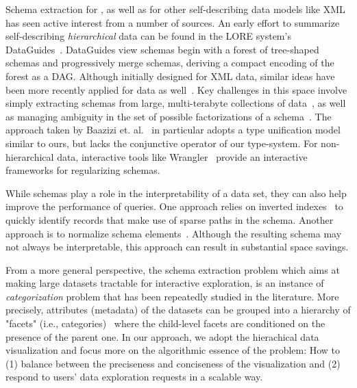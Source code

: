 Schema extraction for \json, as well as for other self-describing data models like XML has seen active interest from a number of sources. 
An early effort to summarize self-describing \emph{hierarchical} data can be found in the LORE system's DataGuides~\cite{DBLP:conf/vldb/GoldmanW97}.
DataGuides view schemas begin with a forest of tree-shaped schemas and progressively merge schemas, deriving a compact encoding of the forest as a DAG.
Although initially designed for XML data, similar ideas have been more recently applied for \json data as well~\cite{DBLP:conf/cidr/LiuG15,DBLP:conf/sigmod/LiuHMLC16}.
Key challenges in this space involve simply extracting schemas from large, multi-terabyte collections of \json data~\cite{DBLP:conf/edbt/BaaziziLCGS17}, as well as managing ambiguity in the set of possible factorizations of a schema~\cite{DBLP:conf/dbpl/BaaziziCGS17,spoth:2017:cidr:adaptive}.
The approach taken by Baazizi et. al.~\cite{DBLP:conf/edbt/BaaziziLCGS17} in particular adopts a type unification model similar to ours, but lacks the conjunctive operator of our type-system.
For non-hierarchical data, interactive tools like Wrangler~\cite{DBLP:conf/chi/KandelPHH11} provide an interactive frameworks for regularizing schemas.

While schemas play a role in the interpretability of a \json data set, they can also help improve the performance of \json queries.  
One approach relies on inverted indexes~\cite{DBLP:conf/cidr/LiuG15} to quickly identify records that make use of sparse paths in the schema.
Another approach is to normalize schema elements~\cite{DBLP:conf/sigmod/DiScalaA16}.  Although the resulting schema may not always be interpretable, this approach can result in substantial space savings.

From a more general perspective, the schema extraction problem which aims at making large datasets tractable for interactive exploration, is an instance of \textit{categorization} problem that has been repeatedly studied in the literature.
More precisely, attributes (metadata) of the datasets can be grouped into a hierarchy of "facets" (i.e., categories)~\cite{Smith:2006:FSS:1187627.1187785} where the child-level facets are conditioned on the presence of the parent one.
In our approach, we adopt the hierachical data visualization and focus more on the algorithmic essence of the problem: How to (1) balance between the preciseness and conciseness of the visualization and (2) respond to users' data exploration requests in a scalable way.